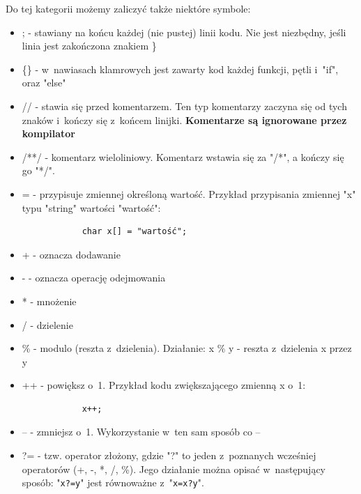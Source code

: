 \documentclass[a4paper,12pt, twoside]{article}
\begin{document}
	Do tej kategorii możemy zaliczyć także niektóre symbole:
	\begin{itemize}
		\item ; - stawiany na końcu każdej (nie pustej) linii kodu. Nie jest niezbędny, jeśli linia jest zakończona znakiem \}
		\item \{\} - w~nawiasach klamrowych jest zawarty kod każdej funkcji, pętli i~"if", oraz "else"
		\item // - stawia się przed komentarzem. Ten typ komentarzy zaczyna się od tych znaków i~kończy się z~końcem linijki. \textbf{Komentarze są ignorowane przez kompilator} 
		\item /**/ - komentarz wieloliniowy. Komentarz wstawia się za "/*", a kończy się go "*/".
		\item = - przypisuje zmiennej określoną wartość. Przykład przypisania zmiennej "x" typu "string" wartości "wartość":
			\begin{verbatim}
			char x[] = "wartość";
			\end{verbatim}
		\item + - oznacza dodawanie
		\item - - oznacza operację odejmowania
		\item * - mnożenie
		\item / - dzielenie
		\item \% - modulo (reszta z~dzielenia). Działanie: x \% y - reszta z~dzielenia x przez y
		\item ++ - powiększ o~1. Przykład kodu zwiększającego zmienną x o~1:
			\begin{verbatim}
			x++;
			\end{verbatim}
		\item -- - zmniejsz o~1. Wykorzystanie w~ten sam sposób co --
		\item ?= - tzw. operator złożony, gdzie "?" to jeden z~poznanych wcześniej operatorów (+, -, *, /, \%). Jego działanie można opisać w~następujący sposób: "\verb|x?=y|" jest równoważne z~"\verb|x=x?y|".
	\end{itemize}
\end{document}
